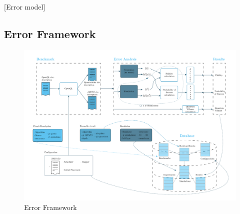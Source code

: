 [Error model]

\subsection*{Error Framework}
\label{sec:org9904620}
\begin{figure}[htbp]
\centering
\includegraphics[width=\textwidth]{figures/error_framework_diagram.png}
\caption{\label{fig:org943bea2}
Error Framework}
\end{figure}

